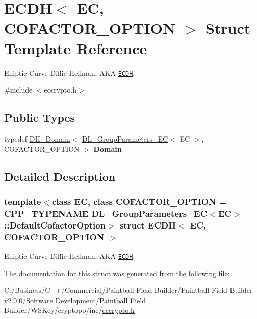 \hypertarget{struct_e_c_d_h}{
\section{ECDH$<$ EC, COFACTOR\_\-OPTION $>$ Struct Template Reference}
\label{struct_e_c_d_h}
}


Elliptic Curve Diffie-\/Hellman, AKA \href{http://www.weidai.com/scan-mirror/ka.html#ECDH}{\tt ECDH}.  


{\ttfamily \#include $<$eccrypto.h$>$}\subsection*{Public Types}
\begin{DoxyCompactItemize}
\item 
\hypertarget{struct_e_c_d_h_aabca05c217c844df9b23ded4488b02a2}{
typedef \hyperlink{class_d_h___domain}{DH\_\-Domain}$<$ \hyperlink{class_d_l___group_parameters___e_c}{DL\_\-GroupParameters\_\-EC}$<$ EC $>$, COFACTOR\_\-OPTION $>$ {\bfseries Domain}}
\label{struct_e_c_d_h_aabca05c217c844df9b23ded4488b02a2}

\end{DoxyCompactItemize}


\subsection{Detailed Description}
\subsubsection*{template$<$class EC, class COFACTOR\_\-OPTION = CPP\_\-TYPENAME DL\_\-GroupParameters\_\-EC$<$EC$>$::DefaultCofactorOption$>$ struct ECDH$<$ EC, COFACTOR\_\-OPTION $>$}

Elliptic Curve Diffie-\/Hellman, AKA \href{http://www.weidai.com/scan-mirror/ka.html#ECDH}{\tt ECDH}. 

The documentation for this struct was generated from the following file:\begin{DoxyCompactItemize}
\item 
C:/Business/C++/Commercial/Paintball Field Builder/Paintball Field Builder v2.0.0/Software Development/Paintball Field Builder/WSKey/cryptopp/inc/\hyperlink{eccrypto_8h}{eccrypto.h}\end{DoxyCompactItemize}
